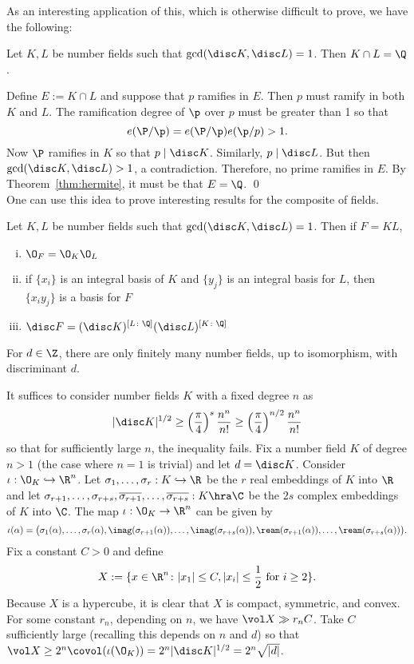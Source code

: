 As an interesting application of this, which is otherwise difficult to prove, we have the following:

\begin{prop}
Let $K,L$ be number fields such that $\gcd(\disc K, \disc L)=1$. Then $K \cap L=\Q$. 
\end{prop}

\pf Define $E:= K \cap L$ and suppose that $p$ ramifies in $E$. Then $p$ must ramify in both $K$ and $L$. The ramification degree of $\p$ over $p$ must be greater than 1 so that
	\[
	e(\P/\p)= e(\P/\p)e(\p/p)>1.
	\]
Now $\P$ ramifies in $K$ so that $p \mid \disc K$. Similarly, $p \mid \disc L$. But then $\gcd(\disc K, \disc L)>1$, a contradiction. Therefore, no prime ramifies in $E$. By Theorem~\ref{thm:hermite}, it must be that $E=\Q$. \qed \\

One can use this idea to prove interesting results for the composite of fields. 

\begin{prop}
Let $K,L$ be number fields such that $\gcd(\disc K, \disc L)=1$. Then if $F=KL$,
\begin{enumerate}[(i)]
\item $\O_F= \O_K\O_L$
\item if $\{x_i\}$ is an integral basis of $K$ and $\{y_j\}$ is an integral basis for $L$, then $\{x_i y_j\}$ is a basis for $F$
\item $\disc F= (\disc K)^{[L \colon \Q]} (\disc L)^{[K \colon \Q]}$
\end{enumerate}
\end{prop}


\begin{thm}
For $d \in \Z$, there are only finitely many number fields, up to isomorphism, with discriminant $d$.
\end{thm}

\pf It suffices to consider number fields $K$ with a fixed degree $n$ as
	\[
	|\disc K|^{1/2} \geq \left(\dfrac{\pi}{4}\right)^s \dfrac{n^n}{n!} \geq \left(\dfrac{\pi}{4}\right)^{n/2} \dfrac{n^n}{n!}
	\]
so that for sufficiently large $n$, the inequality fails. Fix a number field $K$ of degree $n>1$ (the case where $n=1$ is trivial) and let $d=\disc K$. Consider $\iota: \O_K \hookrightarrow \R^n$. Let $\sigma_1,\ldots,\sigma_r: K \hookrightarrow \R$ be the $r$ real embeddings of $K$ into $\R$ and let $\sigma_{r+1},\ldots,\sigma_{r+s}, \overline{\sigma_{r+1}}, \ldots, \overline{\sigma_{r+s}}: K \hra \C$ be the $2s$ complex embeddings of $K$ into $\C$. The map $\iota: \O_K \to \R^n$ can be given by
	\[
	\iota(\alpha)= \big(\sigma_1(\alpha),\ldots,\sigma_r(\alpha), \imag(\sigma_{r+1}(\alpha)), \ldots, \imag(\sigma_{r+s}(\alpha)), \ream(\sigma_{r+1}(\alpha)), \ldots, \ream(\sigma_{r+s}(\alpha)) \big).
	\]
Fix a constant $C>0$ and define 
	\[
	X:= \{ x \in \R^n \colon |x_1| \leq C, |x_i| \leq \frac{1}{2} \text{ for } i\geq 2\}.
	\]
Because $X$ is a hypercube, it is clear that $X$ is compact, symmetric, and convex. For some constant $r_n$, depending on $n$, we have $\vol X \gg r_nC$. Take $C$ sufficiently large (recalling this depends on $n$ and $d$) so that $\vol X \geq 2^n \covol(\iota(\O_K))= 2^n |\disc K|^{1/2}=2^n \sqrt{|d|}$. 

